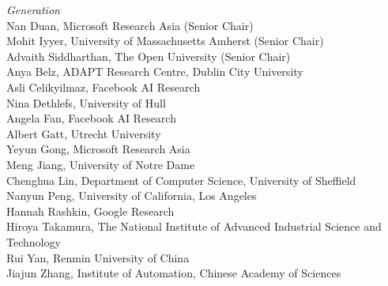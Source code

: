 \emph{Generation} \\
\hspace*{0.2in} Nan Duan, Microsoft Research Asia (Senior Chair)\\
\hspace*{0.2in} Mohit Iyyer, University of Massachusetts Amherst (Senior Chair)\\
\hspace*{0.2in} Advaith Siddharthan, The Open University (Senior Chair)\\
\hspace*{0.2in} Anya Belz, ADAPT Research Centre, Dublin City University\\
\hspace*{0.2in} Asli Celikyilmaz, Facebook AI Research\\
\hspace*{0.2in} Nina Dethlefs, University of Hull\\
\hspace*{0.2in} Angela Fan, Facebook AI Research\\
\hspace*{0.2in} Albert Gatt, Utrecht University\\
\hspace*{0.2in} Yeyun Gong, Microsoft Research Asia\\
\hspace*{0.2in} Meng Jiang, University of Notre Dame\\
\hspace*{0.2in} Chenghua Lin, Department of Computer Science, University of Sheffield \\
\hspace*{0.2in} Nanyun Peng, University of California, Los Angeles\\
\hspace*{0.2in} Hannah Rashkin, Google Research\\
\hspace*{0.2in} Hiroya Takamura, The National Institute of Advanced Industrial Science and Technology\\
\hspace*{0.2in} Rui Yan, Renmin University of China\\
\hspace*{0.2in} Jiajun Zhang, Institute of Automation, Chinese Academy of Sciences\\

